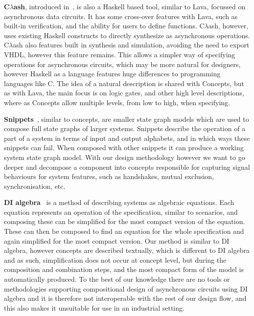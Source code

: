 \documentclass[british,compsoc]{IEEEtran}
\newcommand{\noun}[1]{\textsc{#1}}
\begin{document}
\textbf{C$\lambda$ash}, introduced in~\cite{baaij2009clambdaash},  is also a Haskell based tool, similar to Lava, focussed on asynchronous data circuits.  It has some cross-over
features with Lava, such as built-in verification, and the ability for users to define functions. C$\lambda$ash, however, uses existing Haskell constructs to directly synthesize as
asynchronous operations. C$\lambda$ash also features built in synthesis and simulation, avoiding the need to export VHDL, however this feature remains. This allows a simpler way of
specifying operations for asynchronous circuits, which may be more natural for designers, however Haskell as a language features huge differences to programming languages like
\noun{C}. The idea of a natural description is shared with Concepts, but as with Lava, the main focus is on logic gates, and other high level descriptions, where as Concepts allow
multiple levels, from low to high, when specifying.

\textbf{Snippets}~\cite{raey}, similar to concepts, are smaller
state graph models which are used to compose full state graphs of
larger systems. Snippets describe the operation of a part of a system
in terms of input and output alphabets, and in which ways these snippets
can fail. When composed with other snippets it can produce a working
system state graph model. With our design methodology however we want
to go deeper and decompose a component into concepts responsible for
capturing signal behaviours for system features, such as handshakes,
mutual exclusion, synchronisation, etc.

\textbf{DI algebra}~\cite{josephs1993overview} is a method of describing
systems as algebraic equations. Each equation represents an operation
of the specification, similar to scenarios, and composing these can
be simplified for the most compact version of the equation. These
can then be composed to find an equation for the whole specification
and again simplified for the most compact version. Our method is similar
to DI algebra, however concepts are described textually, which is
different to DI algebra and as such, simplification does not occur
at concept level, but during the composition and combination steps,
and the most compact form of the model is automatically produced.
To the best of our knowledge there are no tools or methodologies supporting
compositional design of asynchronous circuits using DI algebra and
it is therefore not interoperable with the rest of our design flow,
and this also makes it unsuitable for use in an industrial setting.
\end{document}
